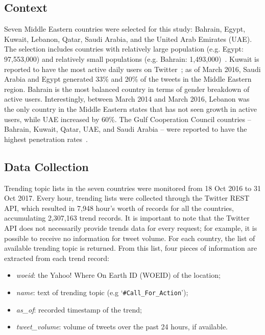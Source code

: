 \documentclass{llncs}
\begin{document}
\subsection{Context}

Seven Middle Eastern countries were selected for this study: Bahrain,
Egypt, Kuwait, Lebanon, Qatar, Saudi Arabia, and the United Arab
Emirates (UAE). The selection includes countries with relatively large
population (e.g. Egypt: 97,553,000) and relatively small populations
(e.g. Bahrain:
1,493,000)~\cite{UnitedNationsDepartmentofEconomicandSocialAffairs2017}. Kuwait
is reported to have the most active daily users on
Twitter~\cite{Salem2017}; as of March 2016, Saudi Arabia and Egypt
generated 33\% and 20\% of the tweets in the Middle Eastern
region. Bahrain is the most balanced country in terms of gender
breakdown of active users. Interestingly, between March 2014 and March
2016, Lebanon was the only country in the Middle Eastern states that
has not seen growth in active users, while UAE increased by 60\%. The
Gulf Cooperation Council countries -- Bahrain, Kuwait, Qatar, UAE, and
Saudi Arabia -- were reported to have the highest penetration
rates~\cite{Salem2017}.

\subsection{Data Collection}

Trending topic lists in the seven countries were monitored from 18 Oct 2016
to 31 Oct 2017. Every hour, trending lists were collected through the 
Twitter REST API, which resulted in 7,948 hour's worth of records for
all the countries, accumulating 2,307,163 trend records. It is important
to note that the Twitter API does not necessarily provide trends data
for every request; for example, it is possible to receive no
information for tweet volume. For each country, the list of available
trending topic is returned. From this list, four pieces of information
are extracted from each trend record:

\begin{itemize}
\item {\emph{woeid}}: the Yahoo! Where On Earth ID (WOEID) of the location;
\item {\emph{name}}: text of trending topic (e.g `{\texttt{\#Call\_For\_Action}}');
\item {\emph{as\_of}}: recorded timestamp of the trend;
\item {\emph{tweet\_volume}}: volume of tweets over the past 24 hours, if available.
\end{itemize}
\end{document}
